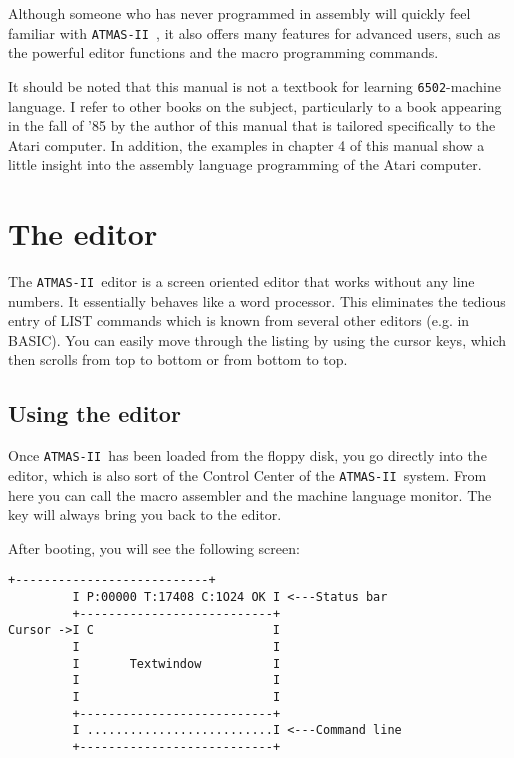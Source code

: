 \documentclass[10pt,a4paper,twoside,final,openright,titlepage]{memoir}
\def\atmas{\texttt{AT\-MAS-II }}
\newcommand{\key}[1]{\keystroke{\tiny #1}}
\begin{document}
Although someone who has never programmed in assembly will quickly feel familiar with \atmas, it also
offers many features for advanced users, such as the powerful editor functions and the macro
programming commands.

It should be noted that this manual is not a textbook for learning \texttt{6502}-machine language.
I refer to other books on the subject, particularly to a book appearing in the fall of '85 by
the author of this manual that is tailored specifically to the Atari computer.
In addition, the examples in chapter 4 of this manual show a little  insight  into the assembly
language  programming  of the Atari  computer.

\chapter{The editor}

The \atmas editor is a screen oriented editor that works without any line numbers.
It essentially behaves like a word processor.
This eliminates the tedious entry of LIST commands which is known from several other
editors (e.g. in BASIC).
You can easily move through the listing by using the cursor keys,
which then scrolls from top to bottom or from bottom to top.

\section{Using the editor}

Once \atmas has been loaded from the floppy disk, you go directly into the editor,
which is also sort of the Control Center of the \atmas system.
From here you can call the macro assembler and the machine language monitor.
The \key{RESET} key will always bring you back to the editor.

After booting, you will see the following screen:

\begin{Verbatim}[samepage=true]
         +---------------------------+
         I P:00000 T:17408 C:1O24 OK I <---Status bar
         +---------------------------+
Cursor ->I C                         I
         I                           I
         I       Textwindow          I
         I                           I
         I                           I
         +---------------------------+
         I ..........................I <---Command line
         +---------------------------+
\end{Verbatim}
\end{document}
